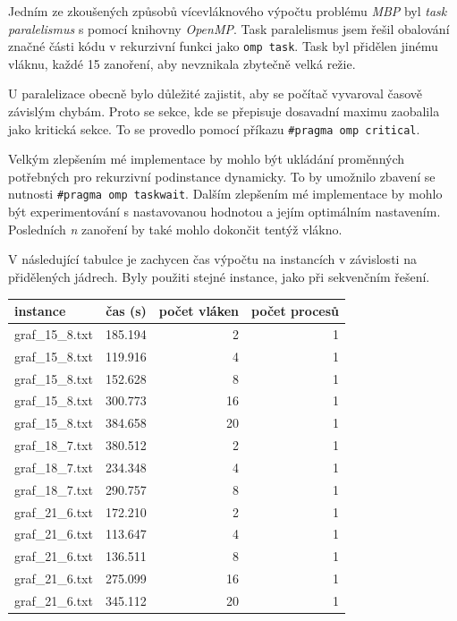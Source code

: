 Jedním ze zkoušených způsobů vícevláknového výpočtu problému \textit{MBP} byl \textit{task paralelismus} s pomocí knihovny \textit{OpenMP}.
Task paralelismus jsem řešil obalování značné části kódu v rekurzivní funkci jako \verb|omp task|.
Task byl přidělen jinému vláknu, každé 15 zanoření, aby nevznikala zbytečně velká režie.

U paralelizace obecně bylo důležité zajistit, aby se počítač vyvaroval časově závislým chybám.
Proto se sekce, kde se přepisuje dosavadní maximu zaobalila jako kritická sekce.
To se provedlo pomocí příkazu \verb|#pragma omp critical|.

Velkým zlepšením mé implementace by mohlo být ukládání proměnných potřebných pro rekurzivní podinstance dynamicky. To by umožnilo zbavení se nutnosti \verb|#pragma omp taskwait|.
Dalším zlepšením mé implementace by mohlo být experimentování s nastavovanou hodnotou a jejím optimálním nastavením.
Posledních \textit{n} zanoření by také mohlo dokončit tentýž vlákno.

V následující tabulce je zachycen čas výpočtu na instancích v závislosti na přidělených jádrech.
Byly použiti stejné instance, jako při sekvenčním řešení.

\FloatBarrier
\begin{table}[]
    \begin{tabular}{l|rrr}
                    instance &    čas (s) &  počet vláken &  počet procesů \\
    \hline
    graf\_15\_8.txt & 185.194 &           2 &         1 \\
    graf\_15\_8.txt & 119.916 &           4 &         1 \\
    graf\_15\_8.txt & 152.628 &           8 &         1 \\
    graf\_15\_8.txt & 300.773 &          16 &         1 \\
    graf\_15\_8.txt & 384.658 &          20 &         1 \\
    graf\_18\_7.txt & 380.512 &           2 &         1 \\
    graf\_18\_7.txt & 234.348 &           4 &         1 \\
    graf\_18\_7.txt & 290.757 &           8 &         1 \\
    graf\_21\_6.txt & 172.210 &           2 &         1 \\
    graf\_21\_6.txt & 113.647 &           4 &         1 \\
    graf\_21\_6.txt & 136.511 &           8 &         1 \\
    graf\_21\_6.txt & 275.099 &          16 &         1 \\
    graf\_21\_6.txt & 345.112 &          20 &         1 \\
    \end{tabular}
\end{table}

